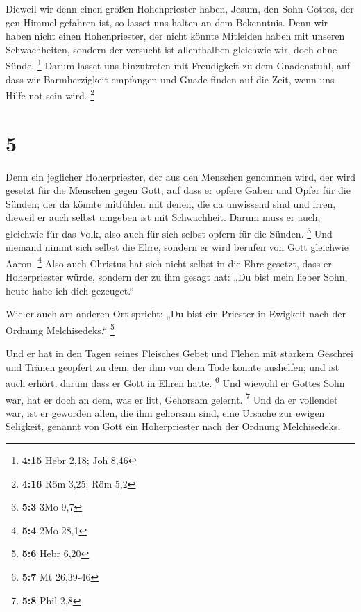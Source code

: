  Dieweil wir denn einen großen Hohenpriester haben, Jesum,
den Sohn Gottes, der gen Himmel gefahren ist, so lasset uns halten an
dem Bekenntnis.  Denn wir haben nicht einen Hohenpriester,
der nicht könnte Mitleiden haben mit unseren Schwachheiten, sondern der
versucht ist allenthalben gleichwie wir, doch ohne Sünde. \footnote{\textbf{4:15}
  Hebr 2,18; Joh 8,46}  Darum lasset uns hinzutreten mit
Freudigkeit zu dem Gnadenstuhl, auf dass wir Barmherzigkeit empfangen
und Gnade finden auf die Zeit, wenn uns Hilfe not sein wird. \footnote{\textbf{4:16}
  Röm 3,25; Röm 5,2}

\hypertarget{section-2}{%
\section{5}\label{section-2}}

 Denn ein jeglicher Hoherpriester, der aus den Menschen
genommen wird, der wird gesetzt für die Menschen gegen Gott, auf dass er
opfere Gaben und Opfer für die Sünden;  der da könnte
mitfühlen mit denen, die da unwissend sind und irren, dieweil er auch
selbst umgeben ist mit Schwachheit.  Darum muss er auch,
gleichwie für das Volk, also auch für sich selbst opfern für die Sünden.
\footnote{\textbf{5:3} 3Mo 9,7}  Und niemand nimmt sich
selbst die Ehre, sondern er wird berufen von Gott gleichwie Aaron.
\footnote{\textbf{5:4} 2Mo 28,1}  Also auch Christus hat
sich nicht selbst in die Ehre gesetzt, dass er Hoherpriester würde,
sondern der zu ihm gesagt hat: „Du bist mein lieber Sohn, heute habe ich
dich gezeuget.``

 Wie er auch am anderen Ort spricht: „Du bist ein Priester
in Ewigkeit nach der Ordnung Melchisedeks.`` \footnote{\textbf{5:6} Hebr
  6,20}

 Und er hat in den Tagen seines Fleisches Gebet und Flehen
mit starkem Geschrei und Tränen geopfert zu dem, der ihm von dem Tode
konnte aushelfen; und ist auch erhört, darum dass er Gott in Ehren
hatte. \footnote{\textbf{5:7} Mt 26,39-46}  Und wiewohl er
Gottes Sohn war, hat er doch an dem, was er litt, Gehorsam gelernt.
\footnote{\textbf{5:8} Phil 2,8}  Und da er vollendet war,
ist er geworden allen, die ihm gehorsam sind, eine Ursache zur ewigen
Seligkeit,  genannt von Gott ein Hoherpriester nach der
Ordnung Melchisedeks.

